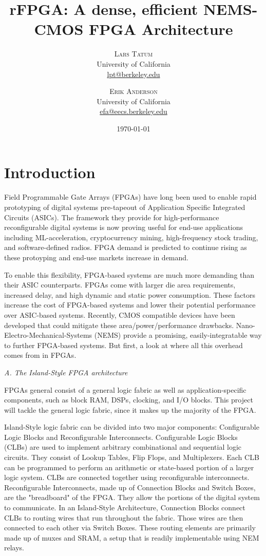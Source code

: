 \documentclass[twoside,twocolumn]{article}
\title{rFPGA: A dense, efficient NEMS-CMOS FPGA Architecture} %
\author{%
\textsc{Lars Tatum}\\[1ex] %
\normalsize University of California \\ %
\normalsize \href{mailto:lpt@berkeley.edu}{lpt@berkeley.edu} %
\and %
\textsc{Erik Anderson}\\[1ex] %
\normalsize University of California \\ %
\normalsize \href{mailto:efa@eecs.berkeley.edu}{efa@eecs.berkeley.edu} %
}
\date{\today} %
\begin{document}
\maketitle


\section{Introduction}
Field Programmable Gate Arrays (FPGAs) have long been used to enable rapid prototyping of digital systems pre-tapeout of Application Specific Integrated Circuits (ASICs)\cite{8187326}. The framework they provide for high-performance reconfigurable digital systems is now proving useful for end-use applications including ML-acceleration, cryptocurrency mining, high-frequency stock trading, and software-defined radios. FPGA demand is predicted to continue rising as these protoyping and end-use markets increase in demand.

To enable this flexibility, FPGA-based systems are much more demanding than their ASIC counterparts. FPGAs come with larger die area requirements, increased delay, and high dynamic and static power consumption. These factors increase the cost of FPGA-based systems and lower their potential performance over ASIC-based systems. Recently, CMOS compatible devices have been developed that could mitigate these area/power/performance drawbacks.  Nano-Electro-Mechanical-Systems (NEMS) provide a promising, easily-integratable way to further FPGA-based systems. But first, a look at where all this overhead comes from in FPGAs.

\textit{A. The Island-Style FPGA architecture}

FPGAs general consist of a general logic fabric as well as application-specific components, such as block RAM, DSPs, clocking, and I/O blocks\cite{8187326}. This project will tackle the general logic fabric, since it makes up the majority of the FPGA.

Island-Style logic fabric can be divided into two major components: Configurable Logic Blocks and Reconfigurable Interconnects. Configurable Logic Blocks (CLBs) are used to implement arbitrary combinational and sequential logic circuits. They consist of Lookup Tables, Flip Flops, and Multiplexers. Each CLB can be programmed to perform an arithmetic or state-based portion of a larger logic system. CLBs are connected together using reconfigurable interconnects. Reconfigurable Interconnects, made up of Connection Blocks and Switch Boxes, are the "breadboard" of the FPGA. They allow the portions of the digital system to communicate. In an Island-Style Architecture, Connection Blocks connect CLBs to routing wires that run throughout the fabric. Those wires are then connected to each other via Switch Boxes. These routing elements are primarily made up of muxes and SRAM, a setup that is readily implementable using NEM relays.
\end{document}
